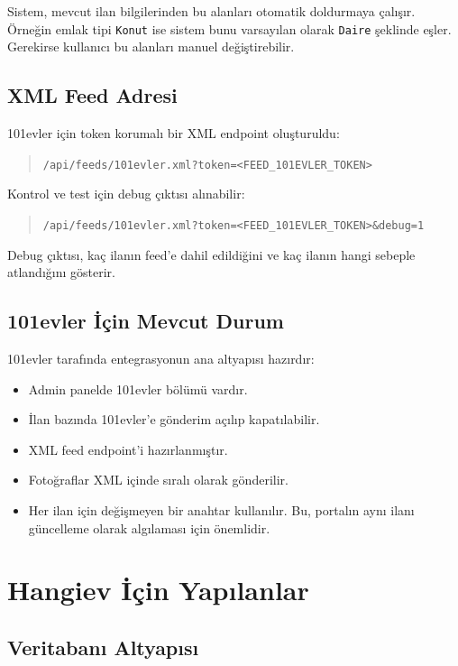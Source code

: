 \documentclass[11pt,a4paper]{article}
\newcommand{\code}[1]{\texttt{#1}}
\begin{document}
Sistem, mevcut ilan bilgilerinden bu alanları otomatik doldurmaya çalışır. Örneğin emlak tipi \code{Konut} ise sistem bunu varsayılan olarak \code{Daire} şeklinde eşler. Gerekirse kullanıcı bu alanları manuel değiştirebilir.

\subsection{XML Feed Adresi}

101evler için token korumalı bir XML endpoint oluşturuldu:

\begin{quote}
\code{/api/feeds/101evler.xml?token=<FEED\_101EVLER\_TOKEN>}
\end{quote}

Kontrol ve test için debug çıktısı alınabilir:

\begin{quote}
\code{/api/feeds/101evler.xml?token=<FEED\_101EVLER\_TOKEN>\&debug=1}
\end{quote}

Debug çıktısı, kaç ilanın feed'e dahil edildiğini ve kaç ilanın hangi sebeple atlandığını gösterir.

\subsection{101evler İçin Mevcut Durum}

101evler tarafında entegrasyonun ana altyapısı hazırdır:

\begin{itemize}
  \item Admin panelde 101evler bölümü vardır.
  \item İlan bazında 101evler'e gönderim açılıp kapatılabilir.
  \item XML feed endpoint'i hazırlanmıştır.
  \item Fotoğraflar XML içinde sıralı olarak gönderilir.
  \item Her ilan için değişmeyen bir anahtar kullanılır. Bu, portalın aynı ilanı güncelleme olarak algılaması için önemlidir.
\end{itemize}

\section{Hangiev İçin Yapılanlar}

\subsection{Veritabanı Altyapısı}
\end{document}
